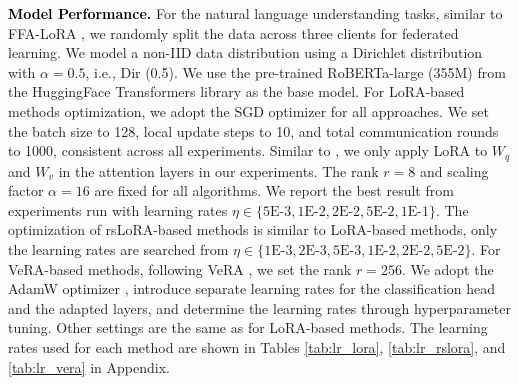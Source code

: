 \documentclass{article} %
\newcommand{\pengxin}[1]{\textcolor{black}{#1}}
\begin{document}
\pengxin{\textbf{Model Performance.}} For the natural language understanding tasks, similar to FFA-LoRA \citep{sun2024fedbpt}, we randomly split the data across three clients for federated learning. We model a non-IID data distribution using a Dirichlet distribution with $\alpha = 0.5$, i.e., Dir (0.5). We use the pre-trained RoBERTa-large (355M) \citep{liu2019roberta} from the HuggingFace Transformers library \citep{wolf2020transformers} as the base model. For LoRA-based methods optimization, we adopt the SGD optimizer \citep{ruder2016overview} for all approaches. We set the batch size to 128, local update steps to 10, and total communication rounds to 1000, consistent across all experiments. Similar to \citet{hulora}, we only apply LoRA to $W_q$ and $W_v$ in the attention layers in our experiments. The rank $r = 8$ and scaling factor $\alpha = 16$ are fixed for all algorithms. We report the best result from experiments run with learning rates $\eta \in \{5\text{E-}3, 1\text{E-}2, 2\text{E-}2, 5\text{E-}2, 1\text{E-}1\}$. The optimization of rsLoRA-based methods is similar to LoRA-based methods, only the learning rates are searched from $\eta \in \{1\text{E-}3, 2\text{E-}3, 5\text{E-}3, 1\text{E-}2, 2\text{E-}2, 5\text{E-}2\}$. For VeRA-based methods, following VeRA \citep{kopiczko2024vera}, we set the rank $r=256$. We adopt the AdamW optimizer \citep{Loshchilov2017DecoupledWD}, introduce separate learning rates for the classification head and the adapted layers, and determine the learning rates through hyperparameter tuning. Other settings are the same as for LoRA-based methods. The learning rates used for each method are shown in Tables \ref{tab:lr_lora}, \ref{tab:lr_rslora}, and \ref{tab:lr_vera} in Appendix.

\vspace{-0.3cm}
\end{document}

